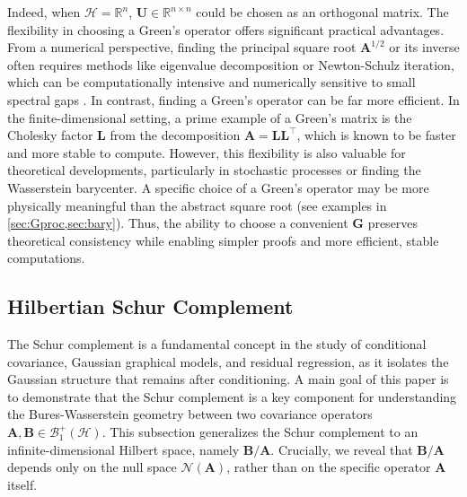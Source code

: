 \documentclass[noinfoline]{imsart}\setcounter{tocdepth}{2}
\renewcommand{\b}[1]{\mathbb{#1}} %
\newcommand{\m}[1]{\mathbf{#1}} %
\renewcommand{\c}[1]{\mathcal{#1}} %
\theoremstyle{plain}
\begin{document}
Indeed, when $\c{H} = \b{R}^{n}$, $\m{U} \in \b{R}^{n \times n}$ could be chosen as an orthogonal matrix. The flexibility in choosing a Green's operator offers significant practical advantages. From a numerical perspective, finding the principal square root $\m{A}^{1/2}$ or its inverse often requires methods like eigenvalue decomposition or Newton-Schulz iteration, which can be computationally intensive and numerically sensitive to small spectral gaps \cite{nocedal1999numerical, golub2013matrix}. In contrast, finding a Green's operator can be far more efficient. In the finite-dimensional setting, a prime example of a Green's matrix is the Cholesky factor $\m{L}$ from the decomposition $\m{A} = \m{L}\m{L}^{\top}$, which is known to be faster and more stable to compute. However, this flexibility is also valuable for theoretical developments, particularly in stochastic processes or finding the Wasserstein barycenter. A specific choice of a Green's operator may be more physically meaningful than the abstract square root (see examples in \cref{sec:Gproc,sec:bary}). Thus, the ability to choose a convenient $\m{G}$ preserves theoretical consistency while enabling simpler proofs and more efficient, stable computations.


\subsection{Hilbertian Schur Complement}\label{ssec:gen:Schur}

The Schur complement is a fundamental concept in the study of conditional covariance, Gaussian graphical models, and residual regression, as it isolates the Gaussian structure that remains after conditioning. A main goal of this paper is to demonstrate that the Schur complement is a key component for understanding the Bures-Wasserstein geometry between two covariance operators $\m{A}, \m{B} \in \c{B}_{1}^{+}(\c{H})$.
This subsection generalizes the Schur complement to an infinite-dimensional Hilbert space, namely $\m{B} / \m{A}$. Crucially, we reveal that $\m{B} / \m{A}$ depends only on the null space $\c{N}(\m{A})$, rather than on the specific operator $\m{A}$ itself.
\end{document}
